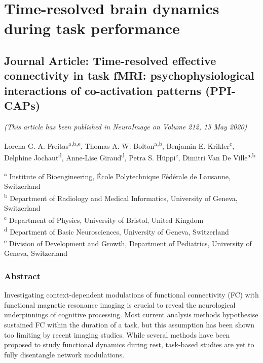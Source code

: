 \chapter{Time-resolved brain dynamics during task performance} \label{chapter:ch5}

\section{Journal Article: Time-resolved effective connectivity in task fMRI: psychophysiological interactions of co-activation patterns (PPI-CAPs)} \label{section:ppicaps_method}

\begin{center}
 \textit{(This article has been published in NeuroImage on Volume 212, 15 May 2020)}
 
Lorena G. A. Freitas\textsuperscript{a,b,e}, 
Thomas A. W. Bolton\textsuperscript{a,b},  
Benjamin E. Krikler\textsuperscript{c}, 
Delphine Jochaut\textsuperscript{d}, 
Anne-Lise Giraud\textsuperscript{d}, 
Petra S. Hüppi\textsuperscript{e},
Dimitri Van De Ville\textsuperscript{a,b} 

\end{center}
\textsuperscript{a} Institute of Bioengineering, École Polytechnique Fédérale de Lausanne, Switzerland \\
\textsuperscript{b} Department of Radiology and Medical Informatics, University of Geneva, Switzerland \\
\textsuperscript{c} Department of Physics, University of Bristol, United Kingdom \\ 
\textsuperscript{d} Department of Basic Neurosciences, University of Geneva, Switzerland \\
\textsuperscript{e} Division of Development and Growth, Department of Pediatrics, University of Geneva, Switzerland \\


\subsection*{Abstract}

Investigating context-dependent modulations of functional connectivity (FC) with functional magnetic resonance imaging is crucial to reveal the neurological underpinnings of cognitive processing. Most current analysis methods hypothesise sustained FC within the duration of a task, but this assumption has been shown too limiting by recent imaging studies. While several methods have been proposed to study functional dynamics during rest, task-based studies are yet to fully disentangle network modulations. 

